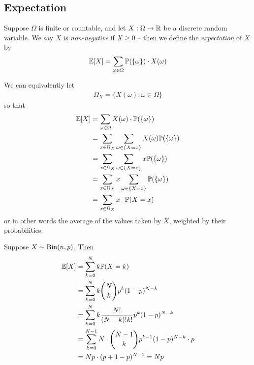 \documentclass{../../template/note}
\begin{document}
    
    \subsection{Expectation}

    \begin{definition}
        Suppose \(\Omega\) is finite or countable, and let \(X: \Omega \to \mathbb R\) be a discrete random variable. We say \(X\) is \emph{non-negative} if \(X \geq 0\) -- then we define the \emph{expectation} of \(X\) by
        \begin{align*}
            \mathbb E[X] = \sum_{\omega \in \Omega} \mathbb P(\{\omega\}) \cdot X(\omega)
        \end{align*}
    \end{definition}
    
    We can equivalently let
    \begin{align*}
        \Omega_X = \{X(\omega): \omega \in \Omega\}
    \end{align*}
    so that
    \begin{align*}
        \mathbb E[X] &= \sum_{\omega \in \Omega}X(\omega) \cdot \mathbb P(\{\omega\}) \\
        &= \sum_{x \in \Omega_X} \sum_{\omega \in \{X = x\}} X(\omega) \mathbb P(\{\omega\}) \\
        &= \sum_{x \in \Omega_X} \sum_{\omega \in \{X = x\}} x \mathbb P(\{\omega\}) \\
        &= \sum_{x \in \Omega_X} x \sum_{\omega \in \{X = x\}} \mathbb P(\{\omega\}) \\
        &= \sum_{x \in \Omega_X} x \cdot  \mathbb P(X = x)
    \end{align*}
    or in other words the average of the values taken by \(X\), weighted by their probabilities.
    
    \begin{example}
        Suppose \(X \sim \operatorname{Bin}(n, p)\). Then
        \begin{align*}
            \mathbb E[X] &= \sum_{k=0}^N k\mathbb P(X = k) \\
            &= \sum_{k=0}^N k \binom N k p^k (1-p)^{N-k} \\
            &= \sum_{k=0}^N k \frac{N!}{(N-k)!k!}p^k(1-p)^{N-k} \\
            &= \sum_{k=0}^{N-1} N \cdot \binom{N-1}{k} p^{k-1} (1-p)^{N-k} \cdot p \\
            &= Np \cdot (p+1-p)^{N-1} = Np
        \end{align*}
    \end{example}
    
\end{document}
